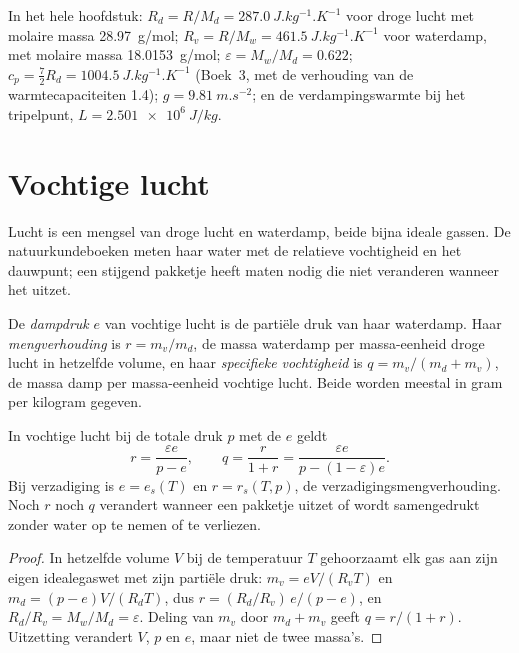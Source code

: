 In het hele hoofdstuk: $R_d = R/M_d = \qty{287.0}{J.kg^{-1}.K^{-1}}$ voor droge lucht met molaire massa
\qty{28.97}{g/mol}; $R_v = R/M_w = \qty{461.5}{J.kg^{-1}.K^{-1}}$ voor waterdamp, met molaire
massa \qty{18.0153}{g/mol}; $\varepsilon = M_w/M_d = 0.622$; $c_p = \tfrac72 R_d =
\qty{1004.5}{J.kg^{-1}.K^{-1}}$ (Boek~3, met de verhouding van de warmtecapaciteiten 1.4);
$g = \qty{9.81}{m.s^{-2}}$; en de verdampingswarmte bij het tripelpunt,
$L = \qty{2.501e6}{J/kg}$.

\section{Vochtige lucht}\label{sec:b2:atmospheric-thermodynamics:moist-air}

Lucht is een mengsel van droge lucht en waterdamp, beide bijna ideale gassen. De natuurkundeboeken
meten haar water met de relatieve vochtigheid en het dauwpunt; een stijgend pakketje heeft maten nodig
die niet veranderen wanneer het uitzet.

\begin{definition}\label{def:b2:atmospheric-thermodynamics:moist-air}
De \emph{dampdruk} $e$ van vochtige lucht is de partiële druk van
haar waterdamp. Haar \emph{mengverhouding} is $r = m_v/m_d$, de massa
waterdamp per massa-eenheid droge lucht in hetzelfde volume, en haar \emph{specifieke
vochtigheid} is $q = m_v/(m_d + m_v)$, de massa damp per massa-eenheid
vochtige lucht. Beide worden meestal in gram per kilogram gegeven.
\end{definition}

\begin{proposition}[Vochtigheidsgrootheden]\label{prop:b2:atmospheric-thermodynamics:humidity}
In vochtige lucht bij de totale druk $p$ met de  $e$ geldt
\[
  r = \frac{\varepsilon e}{p - e}, \qquad q = \frac{r}{1 + r} = \frac{\varepsilon e}{p - (1 -
  \varepsilon)e} .
\]
Bij verzadiging is $e = e_s(T)$ en $r = r_s(T, p)$, de verzadigingsmengverhouding. Noch $r$ noch
$q$ verandert wanneer een pakketje uitzet of wordt samengedrukt zonder water op te nemen of te verliezen.
\end{proposition}

\begin{proof}
In hetzelfde volume $V$ bij de temperatuur $T$ gehoorzaamt elk gas aan zijn eigen idealegaswet met zijn
partiële druk: $m_v = eV/(R_vT)$ en $m_d = (p - e)V/(R_dT)$, dus $r = (R_d/R_v)\,e/(p - e)$,
en $R_d/R_v = M_w/M_d = \varepsilon$. Deling van $m_v$ door $m_d + m_v$ geeft $q = r/(1 + r)$.
Uitzetting verandert $V$, $p$ en $e$, maar niet de twee massa's.
\end{proof}

